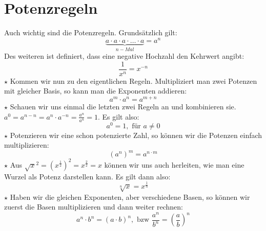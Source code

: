 \section{Potenzregeln}
Auch wichtig sind die Potenzregeln. Grundsätzlich gilt:
\[\underbrace{a\cdot a\cdot a\cdot\ldots\cdot a}_{n-Mal}=a^n\]
Des weiteren ist definiert, dass eine negative Hochzahl den Kehrwert angibt:
\[\frac{1}{x^n}=x^{-n}\]
\(\star\) Kommen wir nun zu den eigentlichen Regeln. Multipliziert man zwei Potenzen mit gleicher Basis, so kann man die Exponenten addieren:
\[a^m\cdot a^n=a^{m+n}\]
\(\star\) Schauen wir uns einmal die letzten zwei Regeln an und kombinieren sie. \(a^0=a^{n-n}=a^n\cdot a^{-n}=\frac{a^n}{a^n}=1\). Es gilt also: \[a^0=1,\text{ für }a\neq 0\]
\(\star\) Potenzieren wir eine schon potenzierte Zahl, so können wir die Potenzen einfach multiplizieren:
\[\left ( a^n \right )^m=a^{n\cdot m}\]
\(\star\) Aus \(\sqrt{x}^2=\left ( x^{\frac{1}{2}}\right )^2=x^{\frac{2}{2}}=x\) können wir uns auch herleiten, wie man eine Wurzel als Potenz darstellen kann. Es gilt dann also:
\[\sqrt[n]{x}=x^{\frac{1}{n}}\]
\(\star\) Haben wir die gleichen Exponenten, aber verschiedene Basen, so können wir zuerst die Basen multiplizieren und dann weiter rechnen:
\[a^n\cdot b^n=(a\cdot b)^n, \textrm{\ bzw\ } \frac{a^n}{b^n}=\left ( \frac{a}{b}\right ) ^n\]
